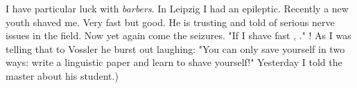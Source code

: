 I have particular luck with \textit{barbers}. In Leipzig I had an epileptic. Recently a new youth shaved me. Very fast but good. He is trusting and told of serious nerve issues in the field. Now yet again come the seizures. "If I shave fast , ." ! As I was telling that to Vossler he burst out laughing: "You can only save yourself in two ways: write a linguistic paper and learn to shave yourself!" 
Yesterday I told the master about his student.)

\missing

%